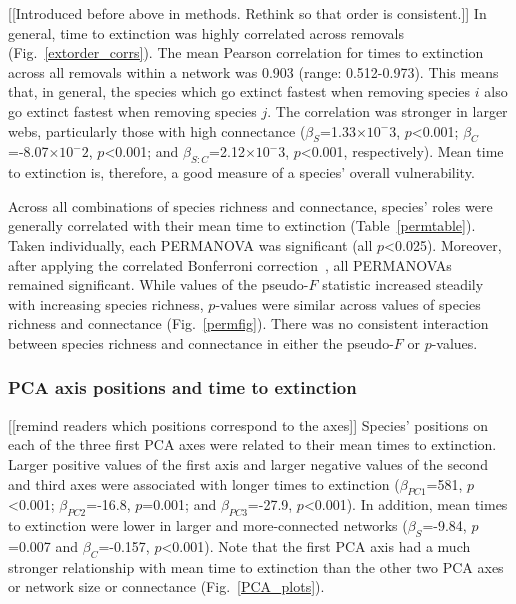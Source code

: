 \documentclass[12pt]{article}
\begin{document}
		[[Introduced before above in methods. Rethink so that order is consistent.]]
		In general, time to extinction was highly correlated across removals (Fig.~\ref{extorder_corrs}). The mean Pearson correlation for times to extinction across all removals within a network was 0.903 (range: 0.512-0.973). This means that, in general, the species which go extinct fastest when removing species $i$ also go extinct fastest when removing species $j$. The correlation was stronger in larger webs, particularly those with high connectance ($\beta_{S}$=1.33$\times10^-3$, $p$\textless0.001; $\beta_{C}$=-8.07$\times10^-2$, $p$\textless0.001; and $\beta_{S:C}$=2.12$\times10^-3$, $p$\textless0.001, respectively). Mean time to extinction is, therefore, a good measure of a species' overall vulnerability.


		Across all combinations of species richness and connectance, species' roles were generally correlated with their mean time to extinction (Table~\ref{permtable}). Taken individually, each PERMANOVA was significant (all $p$\textless0.025). Moreover, after applying the correlated Bonferroni correction~\citep{Drezner2016}, all PERMANOVAs remained significant. While values of the pseudo-$F$ statistic increased steadily with increasing species richness, $p$-values were similar across values of species richness and connectance (Fig.~\ref{permfig}). There was no consistent interaction between species richness and connectance in either the pseudo-$F$ or $p$-values.


		

		\subsubsection*{PCA axis positions and time to extinction}

			[[remind readers which positions correspond to the axes]]
			Species' positions on each of the three first PCA axes were related to their mean times to extinction. Larger positive values of the first axis and larger negative values of the second and third axes were associated with longer times to extinction ($\beta_{PC1}$=581, $p$\textless0.001; $\beta_{PC2}$=-16.8, $p$=0.001; and $\beta_{PC3}$=-27.9, $p$\textless0.001). In addition, mean times to extinction were lower in larger and more-connected networks ($\beta_{S}$=-9.84, $p$=0.007 and $\beta_{C}$=-0.157, $p$\textless0.001). Note that the first PCA axis had a much stronger relationship with mean time to extinction than the other two PCA axes or network size or connectance (Fig.~\ref{PCA_plots}).
\end{document}
